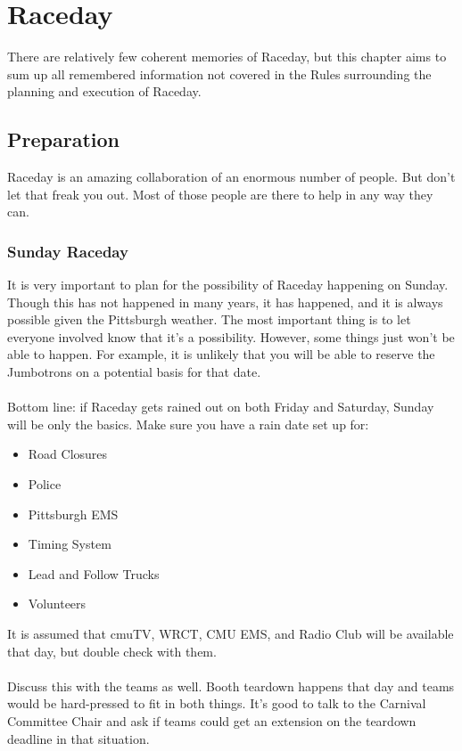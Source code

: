 \chapter{Raceday}
\label{ch:Raceday}
There are relatively few coherent memories of Raceday, but this chapter
aims to sum up all remembered information not covered in the Rules surrounding
the planning and execution of Raceday.

\section{Preparation}
Raceday is an amazing collaboration of an enormous number of people. But
don't let that freak you out. Most of those people are there to help in any
way they can.

\subsection{Sunday Raceday}
It is very important to plan for the possibility of Raceday happening on
Sunday. Though this has not happened in many years, it has happened, and it
is always possible given the Pittsburgh weather. The most important thing
is to let everyone involved know that it's a possibility. However, some
things just won't be able to happen. For example, it is unlikely that you
will be able to reserve the Jumbotrons on a potential basis for that date.
\\\\
Bottom line: if Raceday gets rained out on both Friday and Saturday, Sunday
will be only the basics. Make sure you have a rain date set up for:
\begin{itemize}
\item Road Closures
\item Police
\item Pittsburgh EMS
\item Timing System
\item Lead and Follow Trucks
\item Volunteers
\end{itemize}
It is assumed that cmuTV, WRCT, CMU EMS, and Radio Club will be available
that day, but double check with them.
\\\\
Discuss this with the teams as well. Booth teardown happens that day and
teams would be hard-pressed to fit in both things. It's good to talk to
the Carnival Committee Chair and ask if teams could get an extension on the
teardown deadline in that situation.

